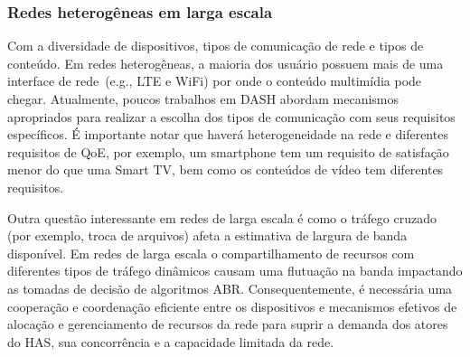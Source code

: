 \subsubsection{Redes heterogêneas em larga escala}
\label{subsec:mobility}

Com a diversidade de dispositivos, tipos de comunicação de rede e tipos de conteúdo. Em redes heterogêneas, a maioria dos usuário possuem mais de uma interface de rede~(e.g., LTE e WiFi) por onde o conteúdo multimídia pode chegar. Atualmente, poucos trabalhos em DASH abordam mecanismos apropriados para realizar a escolha dos tipos de comunicação com seus requisitos específicos.
É importante notar que haverá heterogeneidade na rede e diferentes requisitos de QoE, por exemplo, um smartphone tem um requisito de satisfação menor do que uma Smart TV, bem como os conteúdos de vídeo tem diferentes requisitos.


Outra questão interessante em redes de larga escala é como o tráfego cruzado (por exemplo, troca de arquivos) afeta a estimativa de largura de banda disponível. Em redes de larga escala o compartilhamento de recursos com diferentes tipos de tráfego dinâmicos causam uma flutuação na banda impactando as tomadas de decisão de algoritmos ABR.
Consequentemente, é necessária uma cooperação e coordenação eficiente entre os dispositivos e mecanismos efetivos de alocação e gerenciamento de recursos da rede para suprir a demanda dos atores do HAS, sua concorrência e a capacidade limitada da rede.





